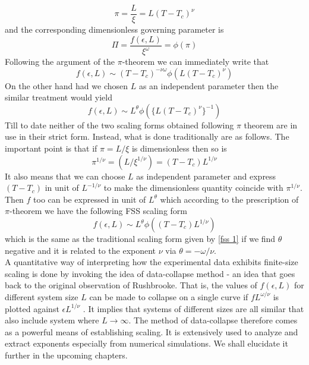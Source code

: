 	\begin{equation}
		\pi = \frac{L}{\xi} = L(T-T_c)^\nu
	\end{equation}
	and the corresponding dimensionless governing parameter is 
	\begin{equation}
		\Pi = \frac{f(\epsilon, L)}{\xi^\omega} = \phi(\pi)
	\end{equation}
	Following the argument of the $\pi$-theorem we can immediately write that
	\begin{equation}
		f(\epsilon, L) \sim (T-T_c)^{-\nu \omega} \phi(L(T-T_c)^\nu)
	\end{equation}
	On the other hand had we chosen $L$ as an independent parameter then the similar treatment would yield
	\begin{equation}
		f(\epsilon, L)  \sim L^\theta \phi(\{L(T-T_c)^\nu\}^{-1})
	\end{equation}
	Till to date neither of the two scaling forms obtained following $\pi$ theorem are in use in their strict form. Instead, what is done traditionally are as follows. The important point is that if $\pi = L/\xi$ is dimensionless then so is 
	\begin{equation}
		\pi^{1/\nu} = (L/\xi^{1/\nu}) = (T-T_c) L^{1/\nu}
	\end{equation}
	It also means that we can choose $L$ as independent parameter and express $(T-T_c)$ in unit of $L^{-1/\nu}$ to make the dimensionless quantity coincide with $\pi^{1/\nu}$. Then $f$ too can be expressed in unit of $L^\theta$ which according to the prescription of $\pi$-theorem we have the following FSS scaling form
	\begin{equation}
		f(\epsilon, L) \sim L^\theta \phi((T-T_c)L^{1/\nu})
	\end{equation}
	which is the same as the traditional scaling form given by \ref{fss 1} if we find $\theta$ negative and it is related to the exponent $\nu$ via $\theta=-\omega/\nu$.\\
	A quantitative way of interpreting how the experimental data exhibits finite-size scaling is done by invoking the idea of data-collapse method - an idea that goes back to the original observation of Rushbrooke. That is, the values of $f(\epsilon,L)$ for different system size $L$ can be	made to collapse on a single curve if $f L^{\omega/\nu}$ is plotted against $\epsilon L ^{1/\nu}$ . It	implies that systems of different sizes are all similar that also include	system where $L \rightarrow \infty$. The method of data-collapse therefore comes as	a powerful means of establishing scaling. It is extensively used to analyze and extract exponents especially from numerical simulations. We	shall elucidate it further in the upcoming chapters.
